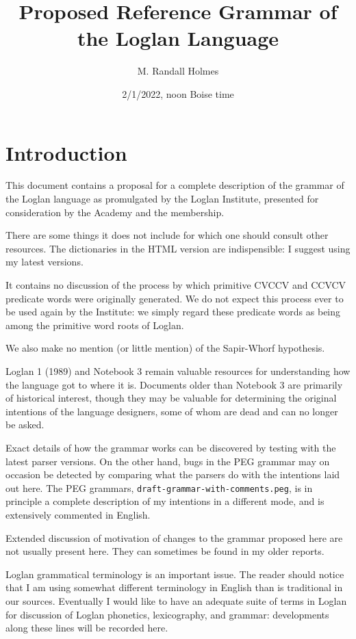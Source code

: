 \documentclass[12pt]{book}
\title{Proposed Reference Grammar of the Loglan Language}
\author{M. Randall Holmes}
\date{2/1/2022, noon Boise time}
\begin{document}
\maketitle

\tableofcontents

\chapter{Introduction}

This document contains a proposal for a complete description of the grammar of the Loglan language as promulgated by the Loglan Institute, presented
for consideration by the Academy and the membership.

There are some things it does not include for which one should consult other resources.  The dictionaries in the HTML version are indispensible:  I suggest using my latest versions.

It contains no discussion of the process by which primitive CVCCV and CCVCV predicate words were originally generated.  We do not expect this process ever to be used again by the Institute:  we simply regard these predicate words as being among the primitive word roots of Loglan.

We also make no mention (or little mention) of the Sapir-Whorf hypothesis.

Loglan 1 (1989) and Notebook 3 remain valuable resources for understanding how the language got to where it is.   Documents older than Notebook 3 are primarily of historical interest, though they may be valuable for determining the original intentions of the language designers, some of whom are dead and can no longer be asked.

Exact details of how the grammar works can be discovered by testing with the latest parser versions.  On the other hand, bugs in the PEG grammar may on occasion be detected by comparing what the parsers do with the intentions laid out here.  The PEG grammars, {\tt draft-grammar-with-comments.peg}, is in principle a complete description of my intentions in a different mode, and is extensively commented in English.

Extended discussion of motivation of changes to the grammar proposed here are not usually present here.  They can sometimes be found in my older reports.

Loglan grammatical terminology is an important issue.  The reader should notice that I am using somewhat different terminology in English than is traditional in our sources.  Eventually I would like to have an adequate suite of terms in Loglan for discussion of Loglan phonetics, lexicography, and grammar:  developments along these lines will be recorded here.
\end{document}
